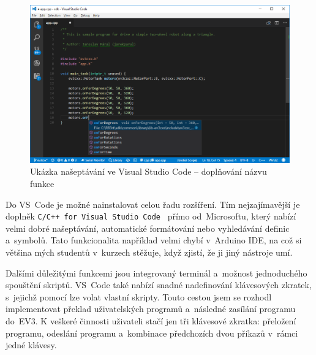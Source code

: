 \begin{figure}[h]
    \centering
    \includegraphics[width=\textwidth]{images/visual-studio-code_intellisense-function.png}
    \caption{Ukázka našeptávání ve Visual Studio Code -- doplňování názvu funkce}
    \label{fig:visual-studio-code_intellisense-function}
\end{figure}


Do VS~Code je možné nainstalovat celou řadu rozšíření. 
Tím nejzajímavější je doplněk  \texttt{C/C++ for Visual Studio Code}~\cite{vs-code_cpptools} přímo od~Microsoftu, který nabízí velmi dobré našeptávání, automatické formátování nebo vyhledávání definic a~symbolů.
Tato funkcionalita například velmi chybí v~Arduino IDE, na což si většina mých studentů v~kurzech stěžuje, když zjistí, že ji jiný nástroje umí.

Dalšími důležitými funkcemi jsou integrovaný terminál a~možnost jednoduchého spouštění skriptů.
VS~Code také nabízí snadné nadefinování klávesových zkratek, s~jejichž pomocí lze volat vlastní skripty.
Touto cestou jsem se rozhodl implementovat překlad uživatelských programů a~následné zasílání programu do~EV3.
K veškeré činnosti uživateli stačí jen tři klávesové zkratka: přeložení programu, odeslání programu a~kombinace předchozích dvou příkazů v~rámci jedné klávesy. 



